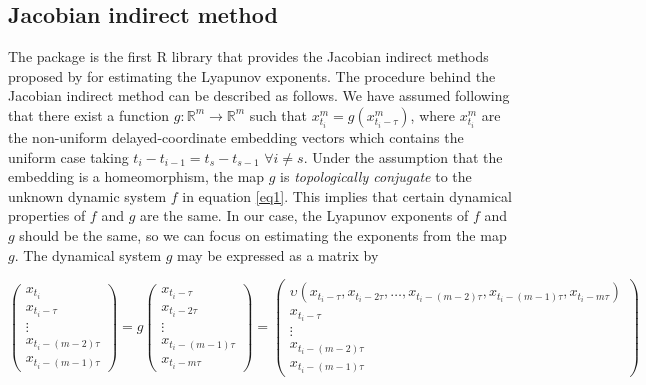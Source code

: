 \subsection{Jacobian indirect method}

The  package is the first R library that provides the Jacobian indirect methods proposed by \cite{Eckmann1985} for estimating the Lyapunov exponents. The procedure behind the Jacobian indirect method can be described as follows. We have assumed following \cite{Gencay1992} that there exist a function $g:{\mathbb{R}^{m}} \to {\mathbb{R}^m}$ such that $x_{t_i}^m = g\left( {x_{t_i - \tau}^m} \right)$, where $x_{{t_i}}^m$ are the non-uniform delayed-coordinate embedding vectors which contains the uniform case taking ${t_i} - {t_{i - 1}} = {t_s} - {t_{s - 1}}$ $\forall i \ne s$. Under the assumption that the embedding is a homeomorphism, the map $g$ is \textit{topologically conjugate} to the unknown dynamic system $f$ in equation \ref{eq1}. This implies that certain dynamical properties of $f$ and $g$ are the same. In our case, the Lyapunov exponents of $f$ and $g$ should be the same, so we can focus on estimating the exponents from the map $g$. The dynamical system $g$ may be expressed as a matrix by

\begin{equation}
\left( {\begin{array}{*{20}{c}}
  {{x_{t_i}}} \\ 
  {{x_{{t_i} - \tau }}} \\ 
   \vdots  \\ 
  {{x_{{t_i} - \left( {m - 2} \right)\tau }}} \\ 
  {{x_{{t_i} - \left( {m - 1} \right)\tau }}} 
\end{array}} \right) = g\left( {\begin{array}{*{20}{c}}
  {{x_{{t_i} - \tau }}} \\ 
  {{x_{{t_i} - 2\tau }}} \\ 
   \vdots  \\ 
  {{x_{{t_i} - \left( {m - 1} \right)\tau }}} \\ 
  {{x_{{t_i} - m\tau }}} 
\end{array}} \right) = \left( {\begin{array}{*{20}{c}}
  {\upsilon \left( {{x_{{t_i} - \tau }},{x_{{t_i} - 2\tau }}, \ldots ,{x_{{t_i} - \left( {m - 2} \right)\tau }},{x_{{t_i} - \left( {m - 1} \right)\tau }},{x_{{t_i} - m\tau }}} \right)} \\ 
  {{x_{{t_i} - \tau }}} \\ 
   \vdots  \\ 
  {{x_{{t_i} - \left( {m - 2} \right)\tau }}} \\ 
  {{x_{{t_i} - \left( {m - 1} \right)\tau }}} 
\end{array}} \right)
\label{eq2}
\end{equation} 

